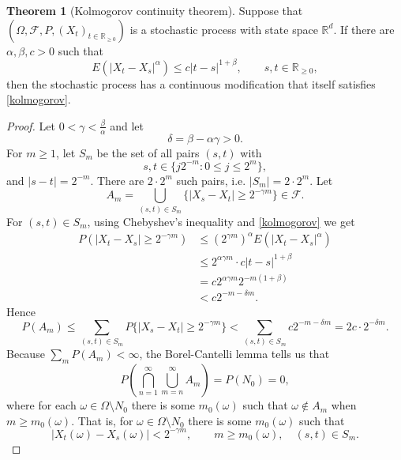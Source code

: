 \documentclass{article}
\theoremstyle{definition}
\newtheorem{theorem}{Theorem}
\theoremstyle{definition}
\begin{document}
\begin{theorem}[Kolmogorov continuity theorem]
Suppose that $(\Omega,\mathscr{F},P,(X_t)_{t \in \mathbb{R}_{\geq 0}})$ is a stochastic process with state space
$\mathbb{R}^d$. If there are $\alpha,\beta,c>0$ such that 
\begin{equation}
E(|X_t-X_s|^\alpha) \leq c | t-s|^{1+\beta}, \qquad s,t \in \mathbb{R}_{\geq 0},
\label{kolmogorov}
\end{equation}
then the stochastic process has a continuous modification that itself satisfies \eqref{kolmogorov}.
\end{theorem}
\begin{proof}
Let $0<\gamma<\frac{\beta}{\alpha}$ and let
\[
\delta = \beta - \alpha \gamma > 0.
\]
For $m \geq 1$, let $S_m$ be the set of all pairs $(s,t)$ with
\[
s,t \in 
\{j2^{-m}: 0 \leq j \leq 2^m\},
\]
and $|s-t|=2^{-m}$. There are $2\cdot 2^m$ such pairs, i.e. $|S_m|=2\cdot 2^m$. 
Let
\[
A_m = \bigcup_{(s,t) \in S_m} \{|X_s-X_t| \geq 2^{-\gamma m}\} \in \mathscr{F}.
\]
For $(s,t) \in S_m$,
using Chebyshev's inequality and \eqref{kolmogorov} we get
\begin{align*}
P(|X_t-X_s| \geq 2^{-\gamma m})&\leq (2^{\gamma m})^\alpha E(|X_t-X_s|^\alpha)\\
&\leq 2^{\alpha \gamma m} \cdot c|t-s|^{1+\beta}\\
&= c2^{\alpha \gamma m} 2^{-m(1+\beta)}\\
&< c2^{-m-\delta m}.
\end{align*}
Hence
\[
P(A_m) \leq \sum_{(s,t) \in S_m} P \{|X_s-X_t| \geq 2^{-\gamma m}\}
<\sum_{(s,t) \in S_m} c 2^{-m-\delta m}
=2c\cdot 2^{-\delta m}.
\]
Because $\sum_m P(A_m)<\infty$, the Borel-Cantelli lemma tells us that
\[
P\left(\bigcap_{n=1}^\infty \bigcup_{m=n}^\infty A_m \right)=P(N_0)=0,
\]
where for  each $\omega \in \Omega \setminus N_0$ there is some $m_0(\omega)$ such that
$\omega \not \in A_m$ when $m \geq m_0(\omega)$. That is,
for $\omega \in \Omega \setminus N_0$ 
there is some $m_0(\omega)$ such that  
\begin{equation}
|X_t(\omega)-X_s(\omega)| < 2^{-\gamma m},
\qquad m \geq m_0(\omega), \quad (s,t) \in S_m.
\label{393}
\end{equation}


\end{proof}
\end{document}
